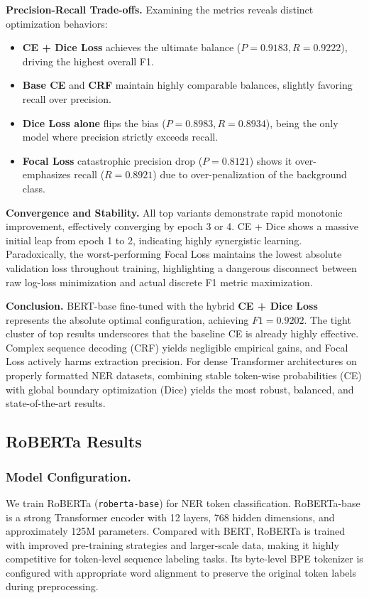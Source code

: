 \noindent \textbf{Precision-Recall Trade-offs.} Examining the metrics reveals distinct optimization behaviors:
\begin{itemize}
    \item \textbf{CE + Dice Loss} achieves the ultimate balance ($P = 0.9183, R = 0.9222$), driving the highest overall F1.
    \item \textbf{Base CE} and \textbf{CRF} maintain highly comparable balances, slightly favoring recall over precision.
    \item \textbf{Dice Loss alone} flips the bias ($P = 0.8983, R = 0.8934$), being the only model where precision strictly exceeds recall.
    \item \textbf{Focal Loss} catastrophic precision drop ($P = 0.8121$) shows it over-emphasizes recall ($R = 0.8921$) due to over-penalization of the background class.
\end{itemize}

\noindent \textbf{Convergence and Stability.} All top variants demonstrate rapid monotonic improvement, effectively converging by epoch 3 or 4. CE + Dice shows a massive initial leap from epoch 1 to 2, indicating highly synergistic learning. Paradoxically, the worst-performing Focal Loss maintains the lowest absolute validation loss throughout training, highlighting a dangerous disconnect between raw log-loss minimization and actual discrete F1 metric maximization.

\noindent \textbf{Conclusion.} BERT-base fine-tuned with the hybrid \textbf{CE + Dice Loss} represents the absolute optimal configuration, achieving $F1 = 0.9202$. The tight cluster of top results underscores that the baseline CE is already highly effective. Complex sequence decoding (CRF) yields negligible empirical gains, and Focal Loss actively harms extraction precision. For dense Transformer architectures on properly formatted NER datasets, combining stable token-wise probabilities (CE) with global boundary optimization (Dice) yields the most robust, balanced, and state-of-the-art results.

\subsection{RoBERTa Results}

\subsubsection{Model Configuration.}
We train RoBERTa (\texttt{roberta-base}) for NER token classification.
RoBERTa-base is a strong Transformer encoder with 12 layers, 768 hidden dimensions, and approximately 125M parameters.
Compared with BERT, RoBERTa is trained with improved pre-training strategies and larger-scale data, making it highly competitive for token-level sequence labeling tasks.
Its byte-level BPE tokenizer is configured with appropriate word alignment to preserve the original token labels during preprocessing.

